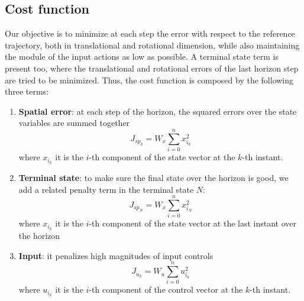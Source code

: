 \subsection{Cost function}
Our objective is to minimize at each step the error with respect to the reference 
trajectory, both in translational and rotational dimension, while also maintaining the
module of the input actions as low as possible. A terminal state term is present too,
where the translational and rotational errors of the last horizon step are tried to 
be minimized. Thus, the cost function is composed by the following three terms:
\begin{enumerate}
    \item \textbf{Spatial error}: at each step of the horizon, the squared errors over the state variables are summed together
                                  \begin{equation}
                                      J_{sp_{k}} = W_{x} \sum_{i=0}^{n}x_{i_{k}}^2
                                  \end{equation}
                                  where $x_{i_{k}}$ it is the $i$-th component of the state vector at the $k$-th instant.

    \item \textbf{Terminal state}: to make sure the final state over the horizon is good, we add a related penalty term in the terminal state $N$:
                                   \begin{equation}
                                    J_{sp_{N}} = W_{x} \sum_{i=0}^{n}x_{i_{N}}^2
                                   \end{equation}
                                   where $x_{i_{k}}$ it is the $i$-th component of the state vector at the last instant over the horizon
    \item \textbf{Input}: it penalizes high magnitudes of input controls 
                                   \begin{equation}
                                        J_{u_{k}} = W_{u} \sum_{i=0}^{n}u_{i_{k}}^2
                                   \end{equation}
                                   where $u_{i_{k}}$ it is the $i$-th component of the control vector at the $k$-th instant.
                               

\end{enumerate}

